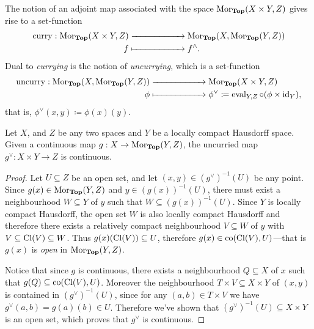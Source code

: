 The notion of an adjoint map associated with the space \(\operatorname{Mor}_{{\textbf{Top}}}(X \times Y,
Z)\) gives rise to a set-function
\begin{align*}
\operatorname{curry}: \operatorname{Mor}_{{\textbf{Top}}}(X \times Y, Z)
&\xrightarrow{\hspace*{2cm}} \operatorname{Mor}_{{\textbf{Top}}}(X, \operatorname{Mor}_{{\textbf{Top}}}(Y, Z)) \\
f &\xmapsto{\hspace*{2cm}} f^{\wedge}.
\end{align*}
Dual to \emph{currying} is the notion of \emph{uncurrying}, which is a
set-function
\begin{align*}
\operatorname{uncurry}: \operatorname{Mor}_{{\textbf{Top}}}(X, \operatorname{Mor}_{{\textbf{Top}}}(Y, Z))
&\xrightarrow{\hspace*{2cm}} \operatorname{Mor}_{{\textbf{Top}}}(X \times Y, Z) \\
\phi &\xmapsto{\hspace*{2cm}}
        \phi^{\vee} \coloneq \operatorname{eval}_{Y, Z} \circ (\phi \times \operatorname{id}_Y),
\end{align*}
that is, \(\phi^{\vee}(x, y) \coloneq \phi(x)(y)\).

\begin{proposition}
\label{prop:uncurrying-continuous}
Let \(X\), and \(Z\) be any two spaces and \(Y\) be a locally compact Hausdorff
space. Given a continuous map \(g: X \to \operatorname{Mor}_{{\textbf{Top}}}(Y, Z)\), the uncurried
map \(g^{\vee}: X \times Y \to Z\) is continuous.
\end{proposition}

\begin{proof}
Let \(U \subseteq Z\) be an open set, and let \((x, y) \in (g^{\vee})^{-1}(U)\)
be any point. Since \(g(x) \in \operatorname{Mor}_{{\textbf{Top}}}(Y, Z)\) and \(y \in (g(x))^{-1}(U)\),
there must exist a neighbourhood \(W \subseteq Y\) of \(y\) such that
\(W \subseteq (g(x))^{-1}(U)\). Since \(Y\) is locally compact Hausdorff, the
open set \(W\) is also locally compact Hausdorff and therefore there exists a
relatively compact neighbourhood \(V \subseteq W\) of \(y\) with
\(V \subseteq \operatorname{Cl}(V) \subseteq W\). Thus \(g(x)(\operatorname{Cl}(V)) \subseteq U\), therefore
\(g(x) \in \operatorname{co}(\operatorname{Cl}(V), U)\)---that is \(g(x)\) is \emph{open} in
\(\operatorname{Mor}_{{\textbf{Top}}}(Y, Z)\).

Notice that since \(g\) is continuous, there exists a neighbourhood
\(Q \subseteq X\) of \(x\) such that \(g(Q) \subseteq \operatorname{co}(\operatorname{Cl}(V), U)\). Moreover
the neighbourhood \(T \times V \subseteq X \times Y\) of \((x, y)\) is contained
in \((g^{\vee})^{-1}(U)\), since for any \((a, b) \in T \times V\) we have
\(g^{\vee}(a, b) = g(a)(b) \in U\). Therefore we've shown that
\((g^{\vee})^{-1}(U) \subseteq X \times Y\) is an open set, which proves that
\(g^{\vee}\) is continuous.
\end{proof}

